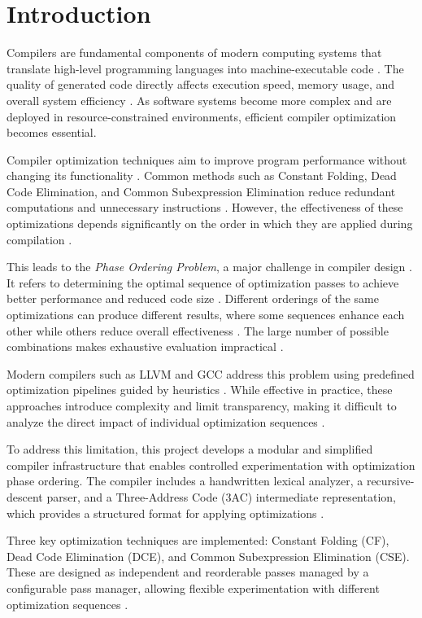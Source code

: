 \documentclass[conference]{IEEEtran}
\begin{document}
\section{Introduction}

Compilers are fundamental components of modern computing systems that translate high-level programming languages into machine-executable code \cite{ref21}. The quality of generated code directly affects execution speed, memory usage, and overall system efficiency \cite{ref18}. As software systems become more complex and are deployed in resource-constrained environments, efficient compiler optimization becomes essential.

Compiler optimization techniques aim to improve program performance without changing its functionality \cite{ref21}. Common methods such as Constant Folding, Dead Code Elimination, and Common Subexpression Elimination reduce redundant computations and unnecessary instructions \cite{ref18}. However, the effectiveness of these optimizations depends significantly on the order in which they are applied during compilation \cite{ref19}.

This leads to the \textit{Phase Ordering Problem}, a major challenge in compiler design \cite{ref1}. It refers to determining the optimal sequence of optimization passes to achieve better performance and reduced code size \cite{ref2}. Different orderings of the same optimizations can produce different results, where some sequences enhance each other while others reduce overall effectiveness \cite{ref19}. The large number of possible combinations makes exhaustive evaluation impractical \cite{ref2}.

Modern compilers such as LLVM and GCC address this problem using predefined optimization pipelines guided by heuristics \cite{ref16}. While effective in practice, these approaches introduce complexity and limit transparency, making it difficult to analyze the direct impact of individual optimization sequences \cite{ref16}.

To address this limitation, this project develops a modular and simplified compiler infrastructure that enables controlled experimentation with optimization phase ordering. The compiler includes a handwritten lexical analyzer, a recursive-descent parser, and a Three-Address Code (3AC) intermediate representation, which provides a structured format for applying optimizations \cite{ref18}.

Three key optimization techniques are implemented: Constant Folding (CF), Dead Code Elimination (DCE), and Common Subexpression Elimination (CSE). These are designed as independent and reorderable passes managed by a configurable pass manager, allowing flexible experimentation with different optimization sequences \cite{ref19}.
\end{document}
